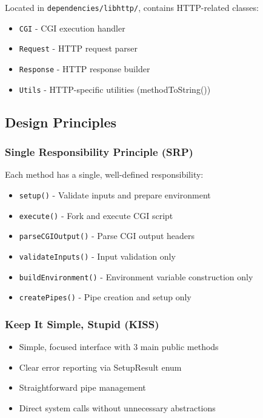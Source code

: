 \documentclass[11pt,a4paper]{article}
\begin{document}
Located in \texttt{dependencies/libhttp/}, contains HTTP-related classes:

\begin{itemize}
    \item \texttt{CGI} - CGI execution handler
    \item \texttt{Request} - HTTP request parser
    \item \texttt{Response} - HTTP response builder
    \item \texttt{Utils} - HTTP-specific utilities (methodToString())
\end{itemize}

\subsection{Design Principles}

\subsubsection{Single Responsibility Principle (SRP)}

Each method has a single, well-defined responsibility:

\begin{itemize}
    \item \texttt{setup()} - Validate inputs and prepare environment
    \item \texttt{execute()} - Fork and execute CGI script
    \item \texttt{parseCGIOutput()} - Parse CGI output headers
    \item \texttt{validateInputs()} - Input validation only
    \item \texttt{buildEnvironment()} - Environment variable construction only
    \item \texttt{createPipes()} - Pipe creation and setup only
\end{itemize}

\subsubsection{Keep It Simple, Stupid (KISS)}

\begin{itemize}
    \item Simple, focused interface with 3 main public methods
    \item Clear error reporting via SetupResult enum
    \item Straightforward pipe management
    \item Direct system calls without unnecessary abstractions
\end{itemize}
\end{document}
